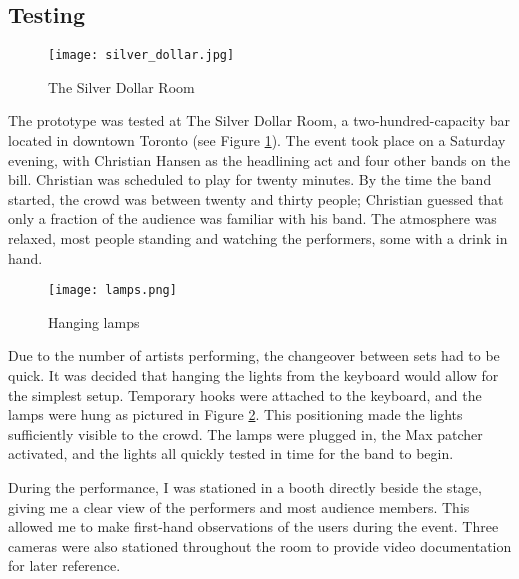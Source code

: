 \subsection{Testing}

\begin{figure}
	\centering

	\texttt{[image: silver\_dollar.jpg]}
	\caption{The Silver Dollar Room}

	\label{prototyping3.8}
\end{figure}

The prototype was tested at The Silver Dollar Room, a two-hundred-capacity bar located in downtown Toronto (see Figure \ref{prototyping3.8}). The event took place on a Saturday evening, with Christian Hansen as the headlining act and four other bands on the bill. Christian was scheduled to play for twenty minutes. By the time the band started, the crowd was between twenty and thirty people; Christian guessed that only a fraction of the audience was familiar with his band. The atmosphere was relaxed, most people standing and watching the performers, some with a drink in hand.

\begin{figure}
	\centering

	\texttt{[image: lamps.png]}
	\caption{Hanging lamps}

	\label{prototyping3.9}
\end{figure}

Due to the number of artists performing, the changeover between sets had to be quick. It was decided that hanging the lights from the keyboard would allow for the simplest setup. Temporary hooks were attached to the keyboard, and the lamps were hung as pictured in Figure \ref{prototyping3.9}. This positioning made the lights sufficiently visible to the crowd. The lamps were plugged in, the Max patcher activated, and the lights all quickly tested in time for the band to begin.

During the performance, I was stationed in a booth directly beside the stage, giving me a clear view of the performers and most audience members. This allowed me to make first-hand observations of the users during the event. Three cameras were also stationed throughout the room to provide video documentation for later reference.

